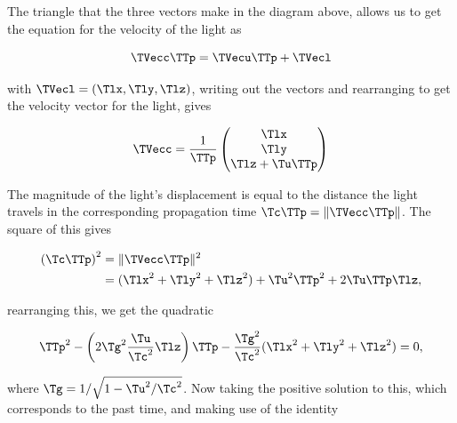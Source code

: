 \begin{derivation}

	The triangle that the three vectors make in the diagram above, allows us to get the equation for the velocity of the light as

	\begin{equation}
		\TVecc  \TTp  = \TVecu  \TTp  + \TVecl
	\end{equation}

	with $\TVecl =(\Tlx ,\Tly ,\Tlz )$, writing out the vectors and rearranging to get the velocity vector for the light, gives

	\begin{equation}
		\label{eq: retarded light velocity vector}
		\TVecc  = \frac{1}{\TTp }
		\begin{pmatrix}
			\Tlx  \\
			\Tly  \\
			\Tlz  + \Tu  \TTp
		\end{pmatrix}
	\end{equation}

	The magnitude of the light's displacement is equal to the distance the light travels in the corresponding propagation time $ \Tc  \TTp  = \|\TVecc  \TTp \|$. The square of this gives

	\begin{equation}
		\begin{aligned}
			\left( \Tc  \TTp \right)^2 & = \|\TVecc  \TTp \|^2                                     \\
			                      & = (\Tlx ^2 + \Tly ^2 + \Tlz ^2) + \Tu ^2 \TTp ^2 + 2\Tu  \TTp  \Tlz ,
		\end{aligned}
	\end{equation}

	rearranging this, we get the quadratic

	\begin{equation}
		\TTp ^2 - \left(2\Tg ^2\frac{\Tu }{\Tc ^2} \Tlz \right)\TTp  - \frac{\Tg ^2}{\Tc ^2}(\Tlx ^2 + \Tly ^2 + \Tlz ^2) = 0,
	\end{equation}

	where $\Tg  = 1/ \sqrt{1 - \Tu ^2/\Tc ^2}$.
	Now taking the positive solution to this, which corresponds to the past time, and making use of the identity


\end{derivation}
